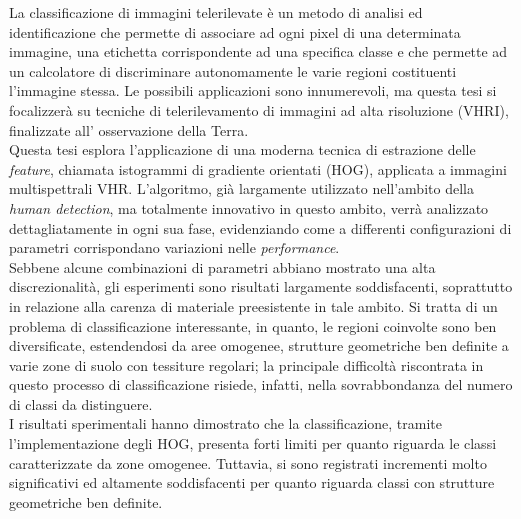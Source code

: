 
\italiano
\sommario
La classificazione di immagini telerilevate è un metodo di analisi ed identificazione che permette di associare ad ogni pixel di una determinata immagine, una etichetta corrispondente ad una specifica classe e che permette ad un calcolatore di discriminare autonomamente le varie regioni costituenti l'immagine stessa. 
Le possibili applicazioni sono innumerevoli, ma questa tesi si focalizzerà su tecniche di telerilevamento di immagini ad alta risoluzione (VHRI), finalizzate all' osservazione della Terra. 
\\
Questa tesi esplora l'applicazione di una moderna tecnica di estrazione delle \emph{feature}, chiamata istogrammi di gradiente orientati (HOG), applicata a immagini multispettrali VHR.   
L'algoritmo, già largamente utilizzato nell'ambito della \emph{human detection}, ma totalmente innovativo in questo ambito, verrà analizzato dettagliatamente in ogni sua fase, evidenziando come a differenti configurazioni di parametri corrispondano variazioni nelle \emph{performance}. 
\\
Sebbene alcune combinazioni di parametri abbiano mostrato una alta discrezionalità, gli esperimenti sono risultati largamente soddisfacenti, soprattutto in relazione alla carenza di materiale preesistente in tale ambito.
Si tratta di un problema di classificazione interessante, in quanto, le regioni coinvolte sono ben diversificate, estendendosi da aree omogenee, strutture geometriche ben definite a varie zone di suolo con tessiture regolari; la principale difficoltà riscontrata in questo processo di classificazione risiede, infatti, nella sovrabbondanza del numero di classi da distinguere.
\\
I risultati sperimentali hanno dimostrato che la classificazione, tramite l'implementazione degli HOG, presenta forti limiti per quanto riguarda le classi caratterizzate da zone omogenee. Tuttavia, si sono registrati incrementi molto significativi ed altamente soddisfacenti per quanto riguarda classi con strutture geometriche ben definite.  


